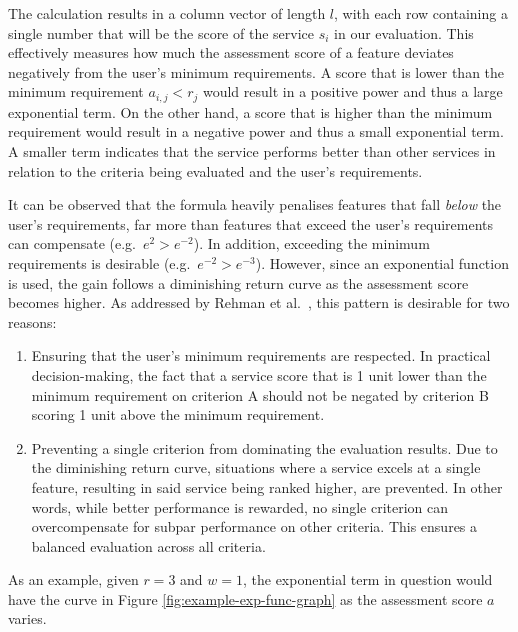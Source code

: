 The calculation results in a column vector of length \(l\), with each
row containing a single number that will be the score of the service
\(s_i\) in our evaluation. This effectively measures how much the
assessment score of a feature deviates negatively from the user's minimum
requirements. A score that is lower than the minimum requirement
\(a_{i,j}<r_j\) would result in a positive power and thus a large
exponential term. On the other hand, a score that is higher than the
minimum requirement would result in a negative power and thus a small
exponential term. A smaller term indicates that the service performs
better than other services in relation to the criteria being evaluated
and the user's requirements.

It can be observed that the formula heavily penalises features that
fall \emph{below} the user's requirements, far more than features that
exceed the user's requirements can compensate (e.g.~\(e^{2} > e^{-2}\)).
In addition, exceeding the minimum requirements is desirable
(e.g.~\(e^{-2}>e^{-3}\)). However, since an exponential function is
used, the gain follows a diminishing return curve as the assessment
score becomes higher. As addressed by Rehman et al.~\cite{5976164}, this
pattern is desirable for two reasons:

\begin{enumerate}
\def\labelenumi{\arabic{enumi}.}
\tightlist
\item
  Ensuring that the user's minimum requirements are respected. In
  practical decision-making, the fact that a service score that is 1 unit lower
  than the minimum requirement on criterion A should not be negated by
  criterion B scoring 1 unit above the minimum requirement.
\item
  Preventing a single criterion from dominating the evaluation results. Due
  to the diminishing return curve, situations where a service excels at a
  single feature, resulting in said service being ranked higher, are
  prevented. In other words, while better performance is rewarded, no
  single criterion can overcompensate for subpar performance on other
  criteria. This ensures a balanced evaluation across all criteria.
\end{enumerate}

As an example, given \(r=3\) and \(w=1\), the exponential term in
question would have the curve in Figure \ref{fig:example-exp-func-graph} as the assessment score \(a\)
varies.

